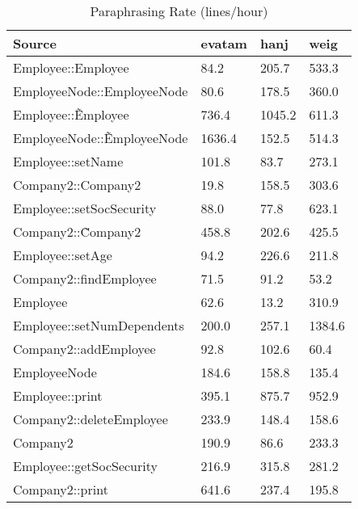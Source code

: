 \begin{table}[hb]
\begin{center}
\begin{tabular}{|l|l|l|l|}
\hline
Source & evatam & hanj & weig\\
\hline
Employee::Employee & 84.2 & 205.7 & 533.3\\
EmployeeNode::EmployeeNode & 80.6 & 178.5 & 360.0\\
Employee::\~Employee & 736.4 & 1045.2 & 611.3\\
EmployeeNode::\~EmployeeNode & 1636.4 & 152.5 & 514.3\\
Employee::setName & 101.8 & 83.7 & 273.1\\
Company2::Company2 & 19.8 & 158.5 & 303.6\\
Employee::setSocSecurity & 88.0 & 77.8 & 623.1\\
Company2::\~Company2 & 458.8 & 202.6 & 425.5\\
Employee::setAge & 94.2 & 226.6 & 211.8\\
Company2::findEmployee & 71.5 & 91.2 & 53.2\\
Employee & 62.6 & 13.2 & 310.9\\
Employee::setNumDependents & 200.0 & 257.1 & 1384.6\\
Company2::addEmployee & 92.8 & 102.6 & 60.4\\
EmployeeNode & 184.6 & 158.8 & 135.4\\
Employee::print & 395.1 & 875.7 & 952.9\\
Company2::deleteEmployee & 233.9 & 148.4 & 158.6\\
Company2 & 190.9 & 86.6 & 233.3\\
Employee::getSocSecurity & 216.9 & 315.8 & 281.2\\
Company2::print & 641.6 & 237.4 & 195.8\\
\hline
\end{tabular}
\end{center}
\caption{Paraphrasing Rate (lines/hour)}
\end{table}

